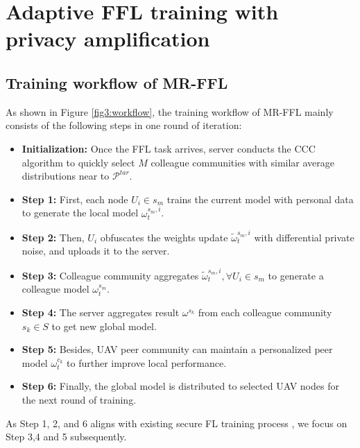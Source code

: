 \documentclass[lettersize,journal]{IEEEtran}
\begin{document}
\section{Adaptive FFL training with privacy amplification}
\subsection{Training workflow of MR-FFL}

As shown in Figure \ref{fig3:workflow}, the training workflow of MR-FFL mainly consists of the following steps in one round of iteration:


\begin{itemize}
    \item \textbf{Initialization:} Once the FFL task arrives, server conducts the CCC algorithm to quickly select $M$ colleague communities with similar average distributions near to $\mathcal{P}^{tar}$.
    \item \textbf{Step 1:} First, each node $U_i \in s_m$ trains the current model with personal data to generate the local model $\omega_t^{s_m, i}$.
    \item \textbf{Step 2:} Then, $U_i$ obfuscates the weights update $\widetilde{\omega}_{t}^{s_{m}, i}$ with differential private noise, and uploads it to the server.
    \item \textbf{Step 3:} Colleague community aggregates $\widetilde{\omega}_{t}^{s_{m}, i}, \forall U_i \in s_m$ to generate a colleague model $\omega_{t}^{s_{m}}$.
    \item \textbf{Step 4:} The server aggregates result $\omega^{s_k}$ from each colleague community $s_k \in S$ to get new global model.
    \item \textbf{Step 5:} Besides, UAV peer community can maintain a personalized peer model $\omega_{t}^{c_{k}}$ to further improve local performance. 
    \item \textbf{Step 6:} Finally, the global model is distributed to selected UAV nodes for the next round of training.
\end{itemize}

As Step 1, 2, and 6 aligns with existing secure FL training process \cite{wei2020federated-NbAFL,padala2021federated}, we focus on Step 3,4 and 5 subsequently.
\end{document}
